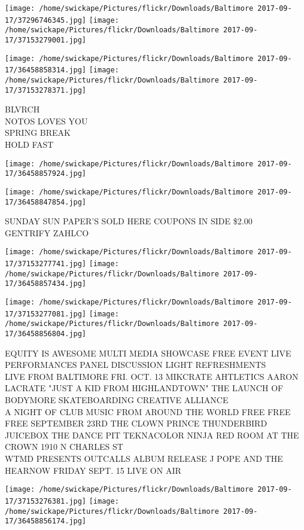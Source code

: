 \documentclass[10pt,letterpaper]{article}
\begin{document}
\texttt{[image: /home/swickape/Pictures/flickr/Downloads/Baltimore 2017-09-17/37296746345.jpg]}
\texttt{[image: /home/swickape/Pictures/flickr/Downloads/Baltimore 2017-09-17/37153279001.jpg]}

\texttt{[image: /home/swickape/Pictures/flickr/Downloads/Baltimore 2017-09-17/36458858314.jpg]}
\texttt{[image: /home/swickape/Pictures/flickr/Downloads/Baltimore 2017-09-17/37153278371.jpg]}

BLVRCH\\
NOTOS LOVES YOU\\
SPRING BREAK\\
HOLD FAST
\pagebreak

\texttt{[image: /home/swickape/Pictures/flickr/Downloads/Baltimore 2017-09-17/36458857924.jpg]}

\vspace{0.25in}
\texttt{[image: /home/swickape/Pictures/flickr/Downloads/Baltimore 2017-09-17/36458847854.jpg]}

SUNDAY SUN PAPER'S SOLD HERE COUPONS IN SIDE \$2.00\\
GENTRIFY ZAHLCO
\pagebreak

\texttt{[image: /home/swickape/Pictures/flickr/Downloads/Baltimore 2017-09-17/37153277741.jpg]}
\texttt{[image: /home/swickape/Pictures/flickr/Downloads/Baltimore 2017-09-17/36458857434.jpg]}

\texttt{[image: /home/swickape/Pictures/flickr/Downloads/Baltimore 2017-09-17/37153277081.jpg]}
\texttt{[image: /home/swickape/Pictures/flickr/Downloads/Baltimore 2017-09-17/36458856804.jpg]}

EQUITY IS AWESOME MULTI MEDIA SHOWCASE FREE EVENT LIVE PERFORMANCES PANEL DISCUSSION LIGHT REFRESHMENTS\\
LIVE FROM BALTIMORE FRI. OCT. 13 MIKCRATE AHTLETICS AARON LACRATE "JUST A KID FROM HIGHLANDTOWN" THE LAUNCH OF BODYMORE SKATEBOARDING CREATIVE ALLIANCE\\
A NIGHT OF CLUB MUSIC FROM AROUND THE WORLD FREE FREE FREE SEPTEMBER 23RD THE CLOWN PRINCE THUNDERBIRD JUICEBOX THE DANCE PIT TEKNACOLOR NINJA RED ROOM AT THE CROWN 1910 N CHARLES ST\\
WTMD PRESENTS OUTCALLS ALBUM RELEASE J POPE AND THE HEARNOW FRIDAY SEPT. 15 LIVE ON AIR
\pagebreak

\texttt{[image: /home/swickape/Pictures/flickr/Downloads/Baltimore 2017-09-17/37153276381.jpg]}
\texttt{[image: /home/swickape/Pictures/flickr/Downloads/Baltimore 2017-09-17/36458856174.jpg]}
\end{document}
